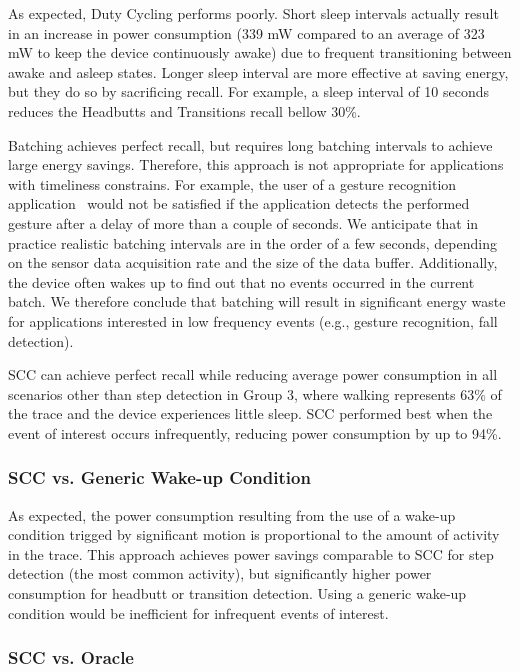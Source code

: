 As expected, Duty Cycling performs poorly.  Short sleep intervals
actually result in an increase in power consumption (339 mW compared to an
average of 323 mW to keep the device continuously awake) due to frequent
transitioning between awake and asleep states.  Longer sleep interval
are more effective at saving energy, but they do so by sacrificing
recall.  For example, a sleep interval of 10 seconds reduces the
Headbutts and Transitions recall bellow 30\%.

Batching achieves perfect recall, but requires long
batching intervals to achieve large energy savings.  Therefore, this
approach is not appropriate for applications with timeliness
constrains.  For example, the user of a gesture recognition
application~\cite{liu2009uwave,schlomer2008gesture} would not be
satisfied if the application detects the performed gesture after a
delay of more than a couple of seconds.  We anticipate that in
practice realistic batching intervals are in the order of a few
seconds, depending on the sensor data acquisition rate and the size
of the data buffer.  Additionally, the device often wakes up to find 
out that no 
events occurred in the current batch. We therefore conclude that 
batching will result in significant energy waste for applications 
interested in low frequency events (e.g., gesture recognition, fall 
detection).

SCC can achieve perfect recall while reducing average power consumption
in all scenarios other than step detection
in Group 3, where walking represents 63\% of the trace and the device
experiences little sleep.  SCC performed best when the event
of interest occurs infrequently, reducing power consumption by up to
94\%.  


\subsubsection{SCC vs. Generic Wake-up Condition}

As expected, the power consumption resulting from the use of a 
wake-up condition trigged by significant motion is 
proportional to the amount of activity in the trace.  This approach
achieves power savings comparable to SCC for step detection (the most
common activity), but significantly higher power consumption for
headbutt or transition detection.  Using a generic wake-up condition
would be inefficient for infrequent events of interest.


\subsubsection{SCC vs. Oracle}

